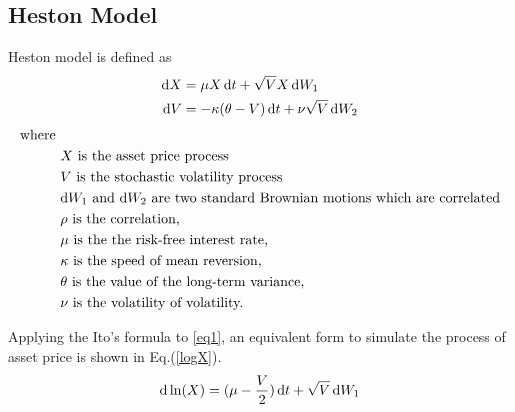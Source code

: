\documentclass{ws-ijfe}
\begin{document}
\subsection{Heston Model}
Heston model is defined as
 \begin{align}
    \d X & =\mu X\,\d t+\sqrt{V}X\,\d W_1\label{eq1}\\
    \d V &= -\kappa (\theta-V)\,\d t +\nu\sqrt{V}\,\d W_2\label{eq2}
  \end{align}
\begin{align*}
\text{where }&\\
   & X\text{ is the asset price process}\\
   & V\text{ is the stochastic volatility process}\\
   & \d W_1 \text{ and } \d W_2 \text{ are two standard Brownian motions which are correlated}\\
   &\rho \text{ is the correlation,} \\
   & \mu \text{ is the the risk-free interest rate,}\\%
   & \kappa \text{ is the speed of mean reversion,} \\
   & \theta \text{ is the value of the long-term variance,} \\
   & \nu \text{ is the volatility of volatility.}
\end{align*}

Applying the Ito's formula to \eqref{eq1}, an equivalent form to simulate the process of asset price is shown in Eq.(\ref{logX}).
\begin{equation}\label{logX}
  \d\ln(X)=(\mu-\frac{V}{2})\,\d t+\sqrt{V}\,\d W_1
\end{equation}
\end{document}
